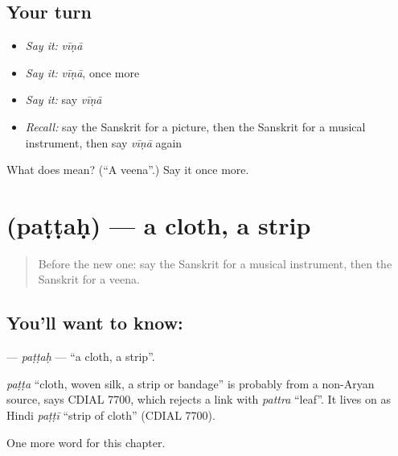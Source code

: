 \subsection*{Your turn}
\begin{itemize}
\raggedright
  \item \emph{Say it:} \emph{vīṇā}
  \item \emph{Say it:} \emph{vīṇā}, once more
  \item \emph{Say it:} say \emph{vīṇā}
  \item \emph{Recall:} say the Sanskrit for a picture, then the Sanskrit for a musical instrument, then say \emph{vīṇā} again
\end{itemize}

\begin{tcolorbox}[breakable,colback=teal!4,colframe=teal!35!black,title={Before you move on}]
What does  mean? (\textquotedblleft{}A veena\textquotedblright{}.) Say it once more.
\end{tcolorbox}
\section[\texorpdfstring{\sk{पट्टः} (paṭṭaḥ)}{पट्टः (paṭṭaḥ)}]{ (paṭṭaḥ) — a cloth, a strip}

\label{lesson:SA-C121-pattah}



\begin{quote}
Before the new one: say the Sanskrit for a musical instrument, then the Sanskrit for a veena.
\end{quote}

\subsection*{You'll want to know: }
\textbf{} — \emph{paṭṭaḥ} — \textquotedblleft{}a cloth, a strip\textquotedblright{}.

\begin{cousinweb}
\emph{paṭṭa} \textquotedblleft{}cloth, woven silk, a strip or bandage\textquotedblright{} is probably from a non-Aryan source, says CDIAL 7700, which rejects a link with \emph{pattra} \textquotedblleft{}leaf\textquotedblright{}. It lives on as Hindi \emph{paṭṭī} \textquotedblleft{}strip of cloth\textquotedblright{} (CDIAL 7700).
\end{cousinweb}

\begin{grammarlens}[title={What you've built}]
One more word for this chapter.
\end{grammarlens}

